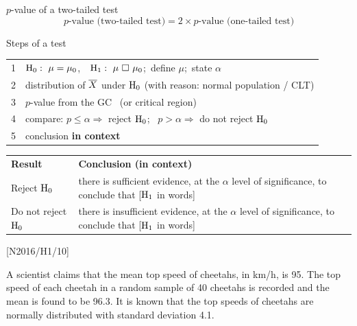 \begin{theorem}[before skip=3mm,after skip=3mm]{$p$-value of a two-tailed test}
\[\text{$p$-value (two-tailed test)}=2\times\text{$p$-value (one-tailed test)}\]
\end{theorem}
\begin{theorem}[before skip=3mm,after skip=3mm]{Steps of a test}
\begin{tabular}{@{}l@{\ \ }l@{}}
1 & $\Hz:\ \mu=\mu_{0}$,\ \ $\Ho:\ \mu\ \square\ \mu_{0}$;\ define $\mu$;\ state $\alpha$\\
2 & distribution of $\overline{X}$ under $\mathrm{H}_{0}$ (with reason: normal population / CLT)\\
3 & $p$-value from the GC \ (or critical region)\\
4 & compare: $p\leqslant\alpha\Rightarrow$ reject $\mathrm{H}_{0}$; \ $p>\alpha\Rightarrow$ do not reject $\mathrm{H}_{0}$\\
5 & conclusion \textbf{in context}\\
\end{tabular}
\end{theorem}
\begin{center}\ba\small
\begin{tabular}{|L{3.6cm}|L{11.6cm}|}\hline
\textbf{Result} & \textbf{Conclusion (in context)}\\\Xhline{2pt}
Reject $\mathrm{H}_{0}$ & there is sufficient evidence, at the $\alpha$ level of significance, to conclude that [$\mathrm{H}_{1}$ in words]\\\hline
Do not reject $\mathrm{H}_{0}$ & there is insufficient evidence, at the $\alpha$ level of significance, to conclude that [$\mathrm{H}_{1}$ in words]\\\hline
\end{tabular}\end{center}
\par
{}
\clearpage
\noindent\exlab \hfill{\small[N2016/H1/10]}\par
\noindent A scientist claims that the mean top speed of cheetahs, in km/h, is 95. The top speed of each cheetah in a random sample of 40 cheetahs is recorded and the mean is found to be 96.3. It is known that the top speeds of cheetahs are normally distributed with standard deviation 4.1.\par
